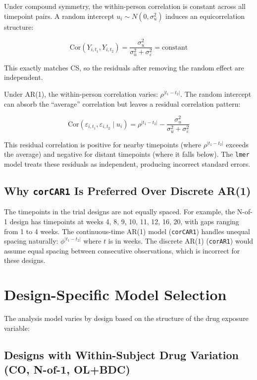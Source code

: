 \documentclass[11pt]{article}
\begin{document}
Under compound symmetry, the within-person correlation is
constant across all timepoint pairs. A random intercept
$u_i \sim N(0, \sigma_u^2)$ induces an equicorrelation
structure:

\[
\text{Cor}(Y_{i,t_1}, Y_{i,t_2}) =
\frac{\sigma_u^2}{\sigma_u^2 + \sigma_\varepsilon^2}
= \text{constant}
\]

This exactly matches CS, so the residuals after removing the
random effect are independent.

Under AR(1), the within-person correlation varies:
$\rho^{|t_1 - t_2|}$. The random intercept can absorb the
``average'' correlation but leaves a residual correlation
pattern:

\[
\text{Cor}(\varepsilon_{i,t_1}, \varepsilon_{i,t_2} \mid u_i) =
\rho^{|t_1 - t_2|} - \frac{\sigma_u^2}{\sigma_u^2 +
\sigma_\varepsilon^2}
\]

This residual correlation is positive for nearby timepoints
(where $\rho^{|t_1 - t_2|}$ exceeds the average) and negative
for distant timepoints (where it falls below). The
\texttt{lmer} model treats these residuals as independent,
producing incorrect standard errors.

\subsection{Why \texttt{corCAR1} Is Preferred Over Discrete
            AR(1)}

The timepoints in the trial designs are not equally spaced.
For example, the N-of-1 design has timepoints at weeks
4, 8, 9, 10, 11, 12, 16, 20, with gaps ranging from
1 to 4 weeks. The continuous-time AR(1) model
(\texttt{corCAR1}) handles unequal spacing naturally:
$\phi^{|t_1 - t_2|}$ where $t$ is in weeks. The discrete
AR(1) (\texttt{corAR1}) would assume equal spacing between
consecutive observations, which is incorrect for these
designs.

\section{Design-Specific Model Selection}

The analysis model varies by design based on the structure
of the drug exposure variable:

\subsection{Designs with Within-Subject Drug Variation
            (CO, N-of-1, OL+BDC)}
\end{document}
